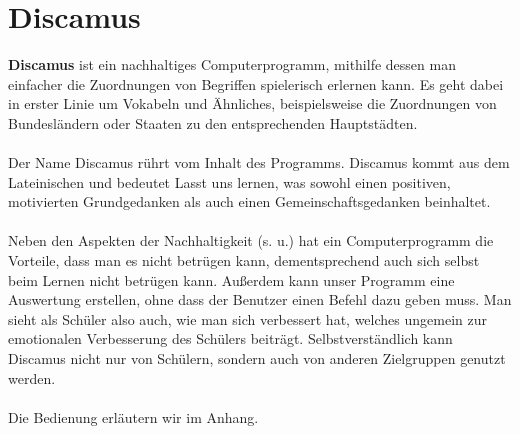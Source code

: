 \documentclass[a4paper, 11pt, titlepage]{article}
\begin{document}
\begin{titlepage}

\end{titlepage}
\tableofcontents

\section{Discamus}
\textbf{Discamus} ist ein nachhaltiges Computerprogramm, mithilfe dessen man einfacher die Zuordnungen von Begriffen spielerisch erlernen kann. Es geht dabei in erster Linie um Vokabeln und Ähnliches, beispielsweise die Zuordnungen von Bundesländern oder Staaten zu den entsprechenden Hauptstädten.\\\\
Der Name Discamus rührt vom Inhalt des Programms. Discamus kommt aus dem Lateinischen und bedeutet \glqq Lasst uns lernen\grqq , was sowohl einen positiven, motivierten Grundgedanken als auch einen Gemeinschaftsgedanken beinhaltet.\\\\
Neben den Aspekten der Nachhaltigkeit (s. u.) hat ein Computerprogramm die Vorteile, dass man es nicht betrügen kann, dementsprechend auch sich selbst beim Lernen nicht betrügen kann. Außerdem kann unser Programm eine Auswertung erstellen, ohne dass der Benutzer einen Befehl dazu geben muss. Man sieht als Schüler also auch, wie man sich verbessert hat, welches ungemein zur emotionalen Verbesserung des Schülers beiträgt. Selbstverständlich kann Discamus nicht nur von Schülern, sondern auch von anderen Zielgruppen genutzt werden.\\\\
Die Bedienung erläutern wir im Anhang.
\end{document}
